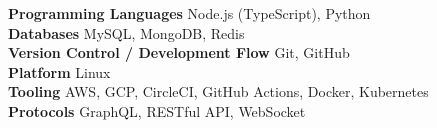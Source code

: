 

\begin{cvparagraph}

\textbf{Programming Languages}
  \hfill{Node.js (TypeScript), Python} \\
\textbf{Databases}
  \hfill{MySQL, MongoDB, Redis} \\
\textbf{Version Control / Development Flow}
  \hfill{Git, GitHub} \\
\textbf{Platform}
  \hfill{Linux} \\
\textbf{Tooling}
  \hfill{AWS, GCP, CircleCI, GitHub Actions, Docker, Kubernetes} \\
\textbf{Protocols}
  \hfill{GraphQL, RESTful API, WebSocket} \\
\end{cvparagraph}
